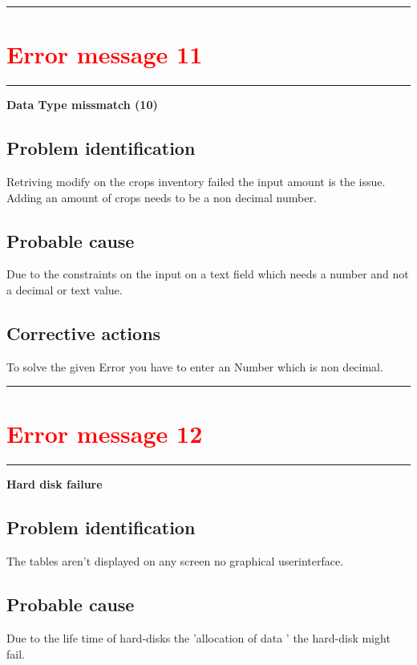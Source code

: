 \vspace{0.5cm}
\hrule







\section{{\textbf{\textcolor{red}{Error message 11}}}}
\hrule
\vspace{0.5cm}
\textbf{Data Type missmatch (10)}

\subsection{Problem identification}
Retriving modify on the crops inventory failed the input amount is the issue.
Adding an amount of crops needs to be a non decimal number.
\subsection{Probable cause}
Due to the constraints on the input on a text field which needs a number and
not a decimal or text value.

\subsection{Corrective actions}
To solve the given Error you have to enter an Number which is non decimal.
\vspace{0.5cm}
\hrule



\break

\section{{\textbf{\textcolor{red}{Error message 12}}}}
\hrule
\vspace{0.5cm}
\textbf{Hard disk failure}

\subsection{Problem identification}
The tables aren't displayed on any screen no graphical userinterface.

\subsection{Probable cause}
Due to the life time of hard-disks the 'allocation of data ' the hard-disk
might fail.

